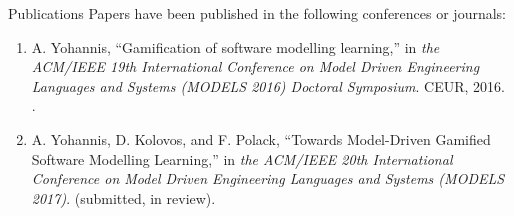 \documentclass[12pt, a4paper]{report} \usepackage[titletoc]{appendix}
\begin{document}
\begingroup

\renewcommand{\chapter}[2]{}%

\endgroup

\chapter{Publications}
\label{Publications}
Papers have been published in the following conferences or journals: 
\begin{enumerate}
 \item A. Yohannis, ``Gamification of software modelling learning,'' in
 \textit{the ACM/IEEE 19th International Conference on Model Driven Engineering Languages and Systems (MODELS 2016) Doctoral Symposium}. CEUR, 2016. \cite{Yohannis2016}.
 \item A. Yohannis, D. Kolovos, and F. Polack, ``Towards Model-Driven Gamified Software Modelling Learning,'' in \textit{the ACM/IEEE 20th International Conference on Model Driven Engineering Languages and Systems (MODELS 2017)}. (submitted, in review).
\end{enumerate}
\end{document}
